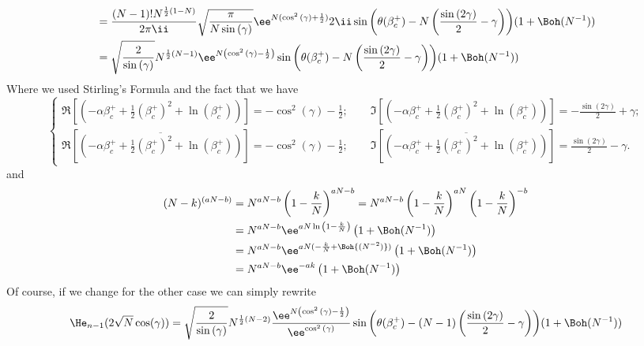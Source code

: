 \begin{equation}
\begin{split}
 		 & = \frac{(N-1)! N^{\frac{1}{2}\left(1-N\right)}}{2\pi \ii} \sqrt{\frac{\pi}{N\sin{(\gamma)}}} \ee^{N(\cos^2{(\gamma)} + \frac{1}{2})}
 		 2\ii \sin{
 		 \left(
 		 \theta(\beta_c^+)
 		 -N\left(\frac{\sin{(2\gamma)}}{2}-\gamma\right)
 		 \right)} 
 		 (1 + \Boh(N^{-1})) \\
 		 & = \sqrt{\frac{2}{\sin{(\gamma)}}}
 		 N^{\frac{1}{2} \left(N - 1\right)}
 		 \ee^{N\left(\cos^2{(\gamma)} - \frac{1}{2} \right)} 
 		 \sin{
 		 \left(
 		 \theta(\beta_c^+) 
 		 -N\left(\frac{\sin{(2\gamma)}}{2}
 		 -\gamma\right)
 		 \right)
 		 } 
 		 (1 + \Boh(N^{-1}))
 	\end{split}
\end{equation}
Where we used Stirling's Formula and the fact that we have
\begin{equation}
	\begin{cases}
		\Re[(-\alpha \beta_c^+ + \frac{1}{2} (\beta_c^+)^2 + \ln{(\beta_c^+)})] = -\cos^2{(\gamma)} - \frac{1}{2}; \qquad \Im[(-\alpha \beta_c^+ + \frac{1}{2} (\beta_c^+)^2 + \ln{(\beta_c^+)})] = -\frac{\sin{(2\gamma)}}{2} + \gamma; \\
		\Re[ \overline{(-\alpha \beta_c^+ + \frac{1}{2} (\beta_c^+)^2 + \ln{(\beta_c^+)})} ] = -\cos^2{(\gamma)} - \frac{1}{2}; \qquad  \Im[ \overline{(-\alpha \beta_c^+ + \frac{1}{2} (\beta_c^+)^2 + \ln{(\beta_c^+)})}] = \frac{\sin{(2\gamma)}}{2} - \gamma.
	\end{cases}
\end{equation}
and 
\begin{align}
	(N-k)^{(aN - b)} & = N^{aN - b} \left(1 - \frac{k}{N} \right)^{aN - b} = N^{aN - b} \left(1 - \frac{k}{N} \right)^{aN} \left(1 - \frac{k}{N} \right)^{-b} \\
	& = N^{aN - b} \ee^{aN \ln{\left(1 - \frac{k}{N} \right)}}  \left(1 + \Boh(N^{-1}) \right) \\
	& = N^{aN - b} \ee^{aN (-\frac{k}{N} + \Boh{(N^{-2})})}  \left(1 + \Boh(N^{-1}) \right) \\
	& = N^{aN - b} \ee^{-ak}  \left(1 + \Boh(N^{-1}) \right)
	\label{Equation: Approximation for N powers}
\end{align}
Of course, if we change for the other case we can simply rewrite
\begin{equation}
	\He_{n-1}(2\sqrt{N}\cos(\gamma)) = \sqrt{\frac{2}{\sin{(\gamma)}}}
	N^{\frac{1}{2} \left(N -2\right)}
	\frac{\ee^{N\left(\cos^2{(\gamma)} - \frac{1}{2} \right)}}{\ee^{\cos^2{(\gamma)}}}
	\sin{
		\left(
		\theta(\beta_c^+) 
		-(N-1)\left(\frac{\sin{(2\gamma)}}{2}
		-\gamma\right)
		\right)
	} 
	(1 + \Boh(N^{-1}))
\end{equation}

